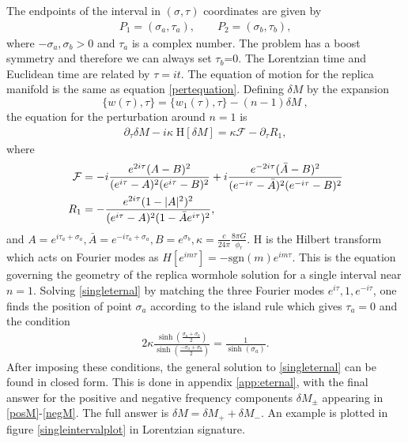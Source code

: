 \documentclass[12pt]{article}
\newcommand{\f}{\frac}
\newcommand{\be}{\begin{equation}}
\newcommand{\ee}{\end{equation}}
\def\be{\begin{eqnarray}}
\def\ee{\end{eqnarray}}
\let\f=\frac
\let\pa=\partial
\def\be{\begin{equation}}
\def\ee{\end{equation}}
\def\ba{\begin{eqnarray}}
\def\ea{\end{eqnarray}}
\numberwithin{equation}{section}
\def\be{\begin{equation}}
\def\ee{\end{equation}}
\def\ba{\begin{eqnarray}}
\def\ea{\end{eqnarray}}
\def\f {\frac}
\def \be {\begin{equation}}
\def \ee {\end{equation}}
\begin{document}
\begin{spacing}{1.1}
The  endpoints of the interval in $(\sigma, \tau)$ coordinates are given by 
\ba
P_1 = (\sigma_a, \tau_a), \qquad P_2 = (\sigma_b, \tau_b),
\ea
where $-\sigma_a,\sigma_b>0$ and $\tau_a$ is a complex number. The problem has a boost symmetry and therefore we can always set $\tau_b$=0.  The Lorentzian time and Euclidean time are related by $\tau= it$.  The equation of motion for the replica manifold is the same as equation \eqref{pertequation}.  Defining $\delta M$ by the expansion
\be
\{ w(\tau), \tau\} = \{ w_1(\tau), \tau\} - (n-1) \delta M \ ,
\ee
the equation for the perturbation around $n=1$ is
\ba\label{singleternal}
\pa_\tau \delta M - i \kappa \; \text{H}[\delta M] =   \kappa \mathcal{F} -\pa_\tau R_1 ,
\ea
where 
\begin{align}
\mathcal{F} &= - i \frac{e^{2 i\tau} (A-B)^2  }{(e^{i\tau} - A)^2 (e^{i \tau} -B)^2} + i \frac{e^{-2 i\tau} (\bar{A}-B)^2  }{(e^{-i\tau} - \bar{A})^2 (e^{-i \tau} -B)^2} \\
R_1 &= - \f{e^{ 2 i \tau} (1- |A|^2)^2}{(e^{ i \tau} - A)^2 (1- \bar{A} e^{i \tau})^2}, \notag
\end{align}
and $A=e^{i\tau_a+\sigma_a}, \bar{A}= e^{- i \tau_a +\sigma_a}, B= e^{\sigma_b}, \kappa= \frac{c}{24 \pi} \f{8\pi G}{\phi_r}$.   H is the  Hilbert transform which acts on Fourier modes as $H [ e^{ i m \tau}] = - \text{sgn}(m) e^{ i m \tau}$. This is the equation governing the geometry of the replica wormhole solution for a single interval near $n=1$.  Solving \eqref{singleternal} by matching the three Fourier modes $e^{ i \tau}, 1, e^{- i \tau}$, one finds the position of point $\sigma_a$ according to the island rule which gives $\tau_a=0$ and the condition \cite{Almheiri:2019yqk, Almheiri:2019qdq}
\ba\label{QESsingle}
 2 \kappa \f{\sinh(\f{\sigma_a+ \sigma_b}{2})}{\sinh (\f{-\sigma_a+\sigma_b}{2})} = \f{1}{\sinh(\sigma_a)}.
\ea
After imposing these conditions, the general solution to \eqref{singleternal} can be found in closed form. This is done in appendix \ref{app:eternal}, with the final answer for the positive and negative frequency components $\delta M_{\pm}$ appearing in \eqref{posM}-\eqref{negM}. The full answer is $\delta M = \delta M_+ + \delta M_-$. An example is plotted in figure \ref{singleintervalplot} in Lorentzian signature. 



\end{spacing}
\end{document}
